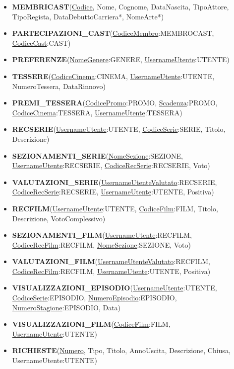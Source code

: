 \documentclass[a4paper,12pt]{report}
\begin{document}
\begin{itemize}
	\item \textbf{MEMBRICAST}(\underline{Codice}, Nome, Cognome, DataNascita, TipoAttore, TipoRegista, DataDebuttoCarriera*, NomeArte*)
	\item \textbf{PARTECIPAZIONI{\_}CAST}(\underline{CodiceMembro}:MEMBROCAST, \underline{CodiceCast}:CAST)
	
	\item \textbf{PREFERENZE}(\underline{NomeGenere}:GENERE, \underline{UsernameUtente}:UTENTE)
	
	\item \textbf{TESSERE}(\underline{CodiceCinema}:CINEMA, \underline{UsernameUtente}:UTENTE, NumeroTessera, DataRinnovo)
	\item \textbf{PREMI{\_}TESSERA}(\underline{CodicePromo}:PROMO, \underline{Scadenza}:PROMO,\\  \underline{CodiceCinema}:TESSERA, \underline{UsernameUtente}:TESSERA)
	
	\item \textbf{RECSERIE}(\underline{UsernameUtente}:UTENTE, \underline{CodiceSerie}:SERIE, Titolo, Descrizione)
	\item \textbf{SEZIONAMENTI{\_}SERIE}(\underline{NomeSezione}:SEZIONE, \underline{UsernameUtente}:RECSERIE, \underline{CodiceRecSerie}:RECSERIE, Voto)
	\item \textbf{VALUTAZIONI{\_}SERIE}(\underline{UsernameUtenteValutato}:RECSERIE,\\  \underline{CodiceRecSerie}:RECSERIE, \underline{UsernameUtente}:UTENTE, Positiva)
	
	\item \textbf{RECFILM}(\underline{UsernameUtente}:UTENTE, \underline{CodiceFilm}:FILM, Titolo, Descrizione, VotoComplessivo)
	\item \textbf{SEZIONAMENTI{\_}FILM}(\underline{UsernameUtente}:RECFILM,\\ 
	\underline{CodiceRecFilm}:RECFILM, \underline{NomeSezione}:SEZIONE, Voto)
	\item \textbf{VALUTAZIONI{\_}FILM}(\underline{UsernameUtenteValutato}:RECFILM,\\ 
	\underline{CodiceRecFilm}:RECFILM, \underline{UsernameUtente}:UTENTE, Positiva)
	
	\item \textbf{VISUALIZZAZIONI{\_}EPISODIO}(\underline{UsernameUtente}:UTENTE,\\
	\underline{CodiceSerie}:EPISODIO,
	\underline{NumeroEpisodio}:EPISODIO, 
	\underline{NumeroStagione}:EPISODIO, Data)
	\item \textbf{VISUALIZZAZIONI{\_}FILM}(\underline{CodiceFilm}:FILM, \underline{UsernameUtente}:UTENTE)
	
	\item \textbf{RICHIESTE}(\underline{Numero}, Tipo, Titolo, AnnoUscita, Descrizione, Chiusa, UsernameUtente:UTENTE)
\end{itemize}
\end{document}
